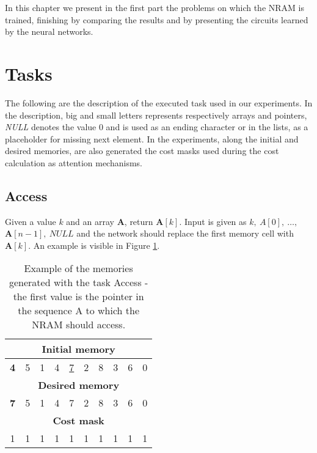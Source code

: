 \label{experiments}
In this chapter we present in the first part the problems on which the NRAM is trained, finishing by comparing the results and by presenting the circuits learned by the neural networks.

\section{Tasks}
The following are the description of the executed task used in our experiments. In the description, big and small letters represents respectively arrays and pointers, \textit{NULL} denotes the value 0 and is used as an ending character or in the lists, as a placeholder for missing next element. In the experiments, along the initial and desired memories, are also generated the cost masks used during the cost calculation as attention mechanisms.

\subsection{Access}
Given a value $k$ and an array \textbf{A}, return $\textbf{A}[k]$. Input is given as $k,\ A[0],\ \dots,\ $\\$\textbf{A}[n-1],\ \textit{NULL}$ and the network should replace the first memory cell with $\textbf{A}[k]$. An example is visible in Figure \ref{fig:access-example}.
\begin{table}[h!]
	\centering
	\begin{tabular}{|c|c|c|c|c|c|c|c|c|c|}
		\hline
		\multicolumn{10}{|c|}{\textbf{Initial memory}} \\ \hline
		\textbf{4} & 5 & 1 & 4 & \underline{7} & 2 & 8 & 3 & 6 & 0 \\ \hline\hline\hline
		\multicolumn{10}{|c|}{\textbf{Desired memory}} \\ \hline
		\textbf{7} & 5 & 1 & 4 & 7 & 2 & 8 & 3 & 6 & 0 \\ \hline\hline\hline
		\multicolumn{10}{|c|}{\textbf{Cost mask}} \\ \hline
		1 & 1 & 1 & 1 & 1 & 1 & 1 & 1 & 1 & 1 \\ \hline
	\end{tabular}
	\caption{Example of the memories generated with the task Access - the first value is the pointer in the sequence A to which the NRAM should access.}
	\label{fig:access-example}
\end{table}
\FloatBarrier

